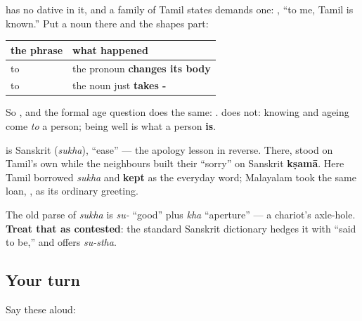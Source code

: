 \begin{grammarlens}[title={Grammar Lens: where the dative is required}]
\textbf{} has no dative in it, and a family of Tamil states demands one: \textbf{  }, \textquotedblleft{}to me, Tamil is known.\textquotedblright{} Put a noun there and the shapes part:

\noindent
\begin{tabularx}{\linewidth}{@{}>{\raggedright\arraybackslash}X>{\raggedright\arraybackslash}X@{}}
\toprule
\textbf{the phrase} & \textbf{what happened} \\
\midrule
\textbf{\ta{நான்}} to \textbf{\ta{எனக்கு}} & the pronoun \textbf{changes its body} \\
\textbf{\ta{நண்பர்}} to \textbf{\ta{நண்பருக்கு}} & the noun just \textbf{takes -\ta{உக்கு}} \\
\bottomrule
\end{tabularx}

So \textbf{  }, and the formal age question does the same: \textbf{   }. \textbf{} does not: knowing and ageing come \emph{to} a person; being well is what a person \textbf{is}.
\end{grammarlens}

\begin{cousinweb}
\textbf{} is Sanskrit \textbf{} (\emph{sukha}), \textquotedblleft{}ease\textquotedblright{} — the apology lesson in reverse. There, \textbf{} stood on Tamil's own \textbf{} while the neighbours built their \textquotedblleft{}sorry\textquotedblright{} on Sanskrit \textbf{kṣamā}. Here Tamil borrowed \emph{sukha} and \textbf{kept } as the everyday word; Malayalam took the same loan, \textbf{}, as its ordinary greeting.

The old parse of \emph{sukha} is \emph{su-} \textquotedblleft{}good\textquotedblright{} plus \emph{kha} \textquotedblleft{}aperture\textquotedblright{} — a chariot's axle-hole. \textbf{Treat that as contested}: the standard Sanskrit dictionary hedges it with \textquotedblleft{}said to be,\textquotedblright{} and offers \emph{su-stha}.
\end{cousinweb}

\subsection*{Your turn}
Say these aloud:

